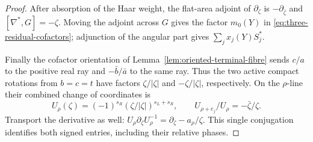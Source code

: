 \begin{proof}
After absorption of the Haar weight, the flat-area adjoint of
\(\partial_\zeta\) is \(-\partial_{\bar\zeta}\) and
\([\nabla^*,G]=-\zeta\). Moving the adjoint across \(G\) gives
the factor \(m_0(Y)\) in \eqref{eq:three-residual-cofactors};
adjunction of the angular part gives \(\sum_jx_j(Y)S_j^*\).

Finally the cofactor orientation of
Lemma~\ref{lem:oriented-terminal-fibre} sends \(c/a\) to the
positive real ray and \(-\bar b/\bar a\) to the same ray.
Thus the two active compact rotations from \(b=c=t\) have factors
\(\zeta/|\zeta|\) and \(-\zeta/|\zeta|\), respectively. On the
\(\rho\)-line their combined change of coordinates is
\[
 U_\rho(\zeta)=(-1)^{s_R}(\zeta/|\zeta|)^{s_L+s_R},
 \qquad U_{\rho+e_j}/U_\rho=-\bar\zeta/\zeta .
\]
Transport the derivative as well:
\(U_\rho\partial_\zeta U_\rho^{-1}
=\partial_\zeta-a_\rho/\zeta\). This single conjugation
identifies both signed entries, including their relative phases.
\end{proof}

